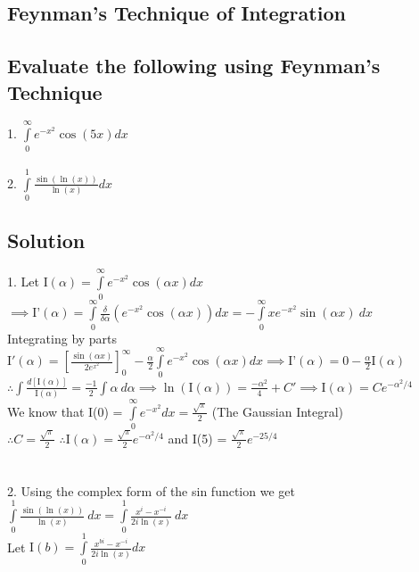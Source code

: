 \documentclass[20pt]{article}
\begin{document}
\begin{large}
	\section{Feynman's Technique of Integration}
	\subsection{Evaluate the following using Feynman's Technique}
	1. $\displaystyle \int\limits_0^\infty e^{-x^2}\cos(5x)dx$ \\ \\
	2. $\displaystyle \int\limits_0^1 \frac{\sin(\ln(x))}{\ln(x)}dx$
	\subsection{Solution}
	1. Let I$\displaystyle(\alpha) = \int\limits_0^\infty e^{-x^2}\cos(\alpha x)dx$ \\
	$\displaystyle\implies\text{I'}(\alpha) = \int\limits_0^\infty \frac{\delta}{\delta \alpha} \left(e^{-x^2}\cos(\alpha x)\right)dx = -\int\limits_0^\infty xe^{-x^2}\sin(\alpha x) \ dx$ \\
	Integrating by parts \\
	$\displaystyle \text{I}'(\alpha) = \left[\frac{\sin(\alpha x)}{2e^{x^2}}\right]_0^\infty - \frac{\alpha}{2}\int\limits_0^\infty e^{-x^2}\cos(\alpha x)dx \implies \text{I'}(\alpha) = 0 - \frac{\alpha}{2}\text{I}(\alpha)$ \\
	$\displaystyle \therefore \int\frac{d\left[\text{I}(\alpha)\right]}{\text{I}(\alpha)} = \frac{-1}{2}\int \alpha \ d\alpha \implies \ln(\text{I}(\alpha)) = \frac{-\alpha^2}{4} +C' \implies \text{I}(\alpha) = Ce^{-\alpha^2/4}$ \\
	We know that I(0) = $\displaystyle \int\limits_0^\infty e^{-x^2} dx = \frac{\sqrt{\pi}}{2}$ (The Gaussian Integral) \\
	$\displaystyle \therefore C = \frac{\sqrt{\pi}}{2}$
	$\displaystyle \therefore \text{I}(\alpha) = \frac{\sqrt{\pi}}{2}e^{-\alpha^2/4}$ and I(5) = $\displaystyle \boxed{\frac{\sqrt{\pi}}{2}e^{-25/4}}$ \\ \\ \\
	2. Using the complex form of the sin function we get \\
	$\displaystyle \int\limits_0^1 \frac{\sin(\ln(x))}{\ln(x)} \ dx = \int\limits_0^1 \frac{x^i-x^{-i}}{2i\ln(x)} \ dx$ \\
	Let $\displaystyle \text{I}(b) = \int\limits_0^1\frac{x^{bi}-x^{-i}}{2i\ln(x)}dx$\\

\end{large}
\end{document}
